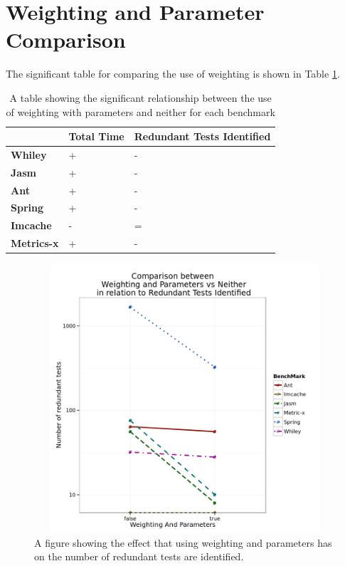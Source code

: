 \section{Weighting and Parameter Comparison}

The significant table for comparing the use of weighting is shown in Table \ref{weightingparamsig}. 

\begin{table}[]
\centering
\caption{A table showing the significant relationship between the use of weighting with parameters and neither for each benchmark}
\label{weightingparamsig}
\begin{tabular}{|l|l|l|}
\hline
{\bf }          & {\bf Total Time} & {\bf Redundant Tests Identified} \\ \hline
{\bf Whiley}    & +                & -                           \\ \hline
{\bf Jasm}      & +                & -                           \\ \hline
{\bf Ant}       & +                & -                           \\ \hline
{\bf Spring}    & +                & -                           \\ \hline
{\bf Imcache}   & -                & =                           \\ \hline
{\bf Metrics-x} & +                & -                           \\ \hline
\end{tabular}
\end{table}

\begin{figure}[h]
\begin{center}
\includegraphics[height=10cm, width = 14.5cm]{WeightNParam.png}
\end{center}
\caption{A figure showing the effect that using weighting and parameters has on the number of redundant tests are identified.}
\label{fig:weightingparamgraph}
\end{figure}
